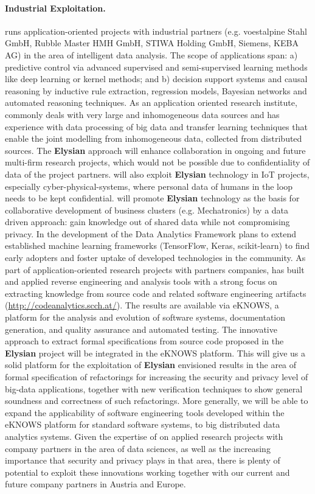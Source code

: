 \documentclass[a4paper,11pt]{article}
\newcommand{\project}[1]{\textbf{#1}\xspace}
\newcommand{\SECURITY}{\project{Elysian}}
\newcommand{\TheProject}{\SECURITY}
\begin{document}
\paragraph{Industrial Exploitation.} \SCCHshort{} runs application-oriented projects with industrial partners (e.g. voestalpine Stahl GmbH, Rubble Master HMH GmbH, STIWA Holding GmbH, Siemens, KEBA AG) in the area of intelligent data analysis. The scope of applications span: a) predictive control via advanced supervised and semi-supervised learning methods like deep learning or kernel methods; and b) decision support systems and causal reasoning by inductive rule extraction, regression models, Bayesian networks and automated reasoning techniques. As an application oriented research institute, \SCCHshort{} commonly deals with very large and inhomogeneous data sources and has experience with data processing of big data and transfer learning techniques that enable the joint modelling from inhomogeneous data, collected from distributed sources. The \TheProject{} approach will enhance collaboration in ongoing and future multi-firm research projects, which would not be possible due to confidentiality of data of the project partners. \SCCHshort{} will also exploit \TheProject{} technology in IoT projects, especially cyber-physical-systems, where personal data of humans in the loop needs to be kept confidential. \SCCHshort{} will promote \TheProject{} technology as the basis for collaborative development of business clusters (e.g. Mechatronics) by a data driven approach: gain knowledge out of shared data while not compromising privacy. In the development of the Data Analytics Framework \SCCHshort{} plans to extend established machine learning frameworks (TensorFlow, Keras, scikit-learn) to find early adopters and foster uptake of developed technologies in the community. 
%
As part of application-oriented research projects with partners companies, \SCCHshort{} has built and applied reverse engineering and analysis tools with a strong focus on extracting knowledge from source code and related software engineering artifacts (\url{http://codeanalytics.scch.at/}). The results are available via eKNOWS, a platform for the analysis and evolution of software systems, documentation generation, and quality assurance and automated testing. The innovative approach to extract formal specifications from source code proposed in the \TheProject{} project will be integrated in the eKNOWS platform. This will give us a solid platform for the exploitation of \TheProject{} envisioned results in the area of formal specification of refactorings for increasing the security and privacy level of big-data applications, together with new verification techniques to show general soundness and correctness of such refactorings. More generally, we will be able to expand the applicability of software engineering tools developed within the eKNOWS platform for standard software systems, to big distributed data analytics systems. Given the expertise of \SCCHshort{} on applied research projects with company partners in the area of data sciences, as well as the increasing importance that security and privacy plays in that area, there is plenty of potential to exploit these innovations working together with our current and future company partners in Austria and Europe.
\end{document}
